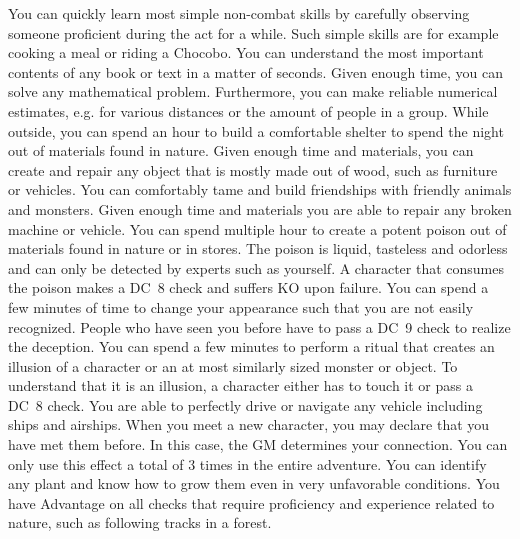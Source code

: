\vfill
{}
{
	You can quickly learn most simple non-combat skills by carefully observing someone proficient during the act for a while. 
	Such simple skills are for example cooking a meal or riding a Chocobo.
}
\newpage
{}
{
	You can understand the most important contents of any book or text in a matter of seconds.
}
\vfill
{}
{
	Given enough time, you can solve any mathematical problem.
	Furthermore, you can make reliable numerical estimates, e.g. for various distances or the amount of people in a group.
}
\vfill
{}
{
	While outside, you can spend an hour to build a comfortable shelter to spend the night out of materials found in nature.
}	
\vfill
{}
{
	Given enough time and materials, you can create and repair any object that is mostly made out of wood, such as furniture or vehicles.
}
\vfill
{}
{
	You can comfortably tame and build friendships with friendly animals and monsters.
}
\vfill
{}
{
	Given enough time and materials you are able to repair any broken machine or vehicle. 
}
\vfill
{}
{
	You can spend multiple hour to create a potent poison out of materials found in nature or in stores.
	The poison is liquid, tasteless and odorless and can only be detected by experts such as yourself.
	A character that consumes the poison makes a DC~8 check and suffers KO upon failure.
}
\vfill
{}
{
	You can spend a few minutes of time to change your appearance such that you are not easily recognized.
	People who have seen you before have to pass a DC~9 check to realize the deception.
}
\vfill
{}
{
	You can spend a few minutes to perform a ritual that creates an illusion of a character or an at most similarly sized monster or object.
	To understand that it is an illusion, a character either has to touch it or pass a DC~8 check.
}
\vfill
{}
{
	You are able to perfectly drive or navigate any vehicle including ships and airships. 
}
\vfill
{}
{
	When you meet a new character, you may declare that you have met them before.
	In this case, the GM determines your connection.	
	You can only use this effect a total of 3 times in the entire adventure.
}
\vfill
{} 
{
	You can identify any plant and know how to grow them even in very unfavorable conditions.
}
\vfill
{}
{
	You have Advantage on all checks that require proficiency and experience related to nature, such as following tracks in a forest. 
}
%
